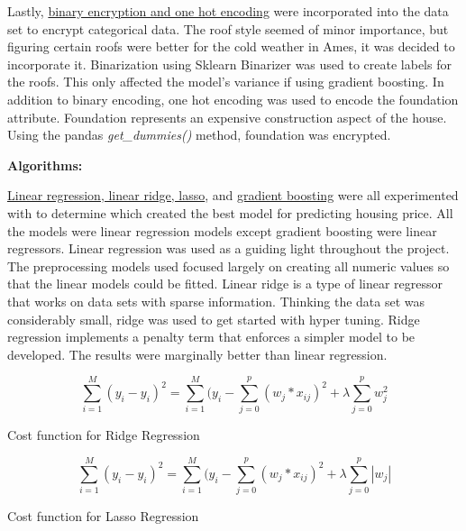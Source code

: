 \documentclass[letterpaper,10pt]{article}
\begin{document}
Lastly, \href{https://towardsdatascience.com/smarter-ways-to-encode-categorical-data-for-machine-learning-part-1-of-3-6dca2f71b159} {binary encryption and one hot encoding} were incorporated into the data set to encrypt categorical data. The roof style seemed of minor importance, but figuring certain roofs were better for the cold weather in Ames, it was decided to incorporate it. Binarization using Sklearn Binarizer was used to create labels for the roofs. This only affected the model’s variance if using gradient boosting. In addition to binary encoding, one hot encoding was used to encode the foundation attribute. Foundation represents an expensive construction aspect of the house. Using the pandas {\it get\_dummies()} method, foundation was encrypted. 

    \textbf{Algorithms:} \par
\href{https://www.analyticsvidhya.com/blog/2017/06/a-comprehensive-guide-for-linear-ridge-and-lasso-regression/} {Linear regression, linear ridge, lasso}, and \href{https://scikit-learn.org/stable/modules/generated/sklearn.ensemble.GradientBoostingClassifier.html}{gradient boosting} were all experimented with to determine which created the best model for predicting housing price. All the models were linear regression models except gradient boosting were linear regressors. Linear regression was used as a guiding light throughout the project. The preprocessing models used focused largely on creating all numeric values so that the linear models could be fitted. 
Linear ridge is a type of linear regressor that works on data sets with sparse information. Thinking the data set was considerably small, ridge was used to get started with hyper tuning. Ridge regression implements a penalty term that enforces a simpler model to be developed. The results were marginally better than linear regression.\par

$$\sum_{i=1}^{M} (y_i - y_i)^2 = \sum_{i=1}^{M}(y_i - \sum_{j=0}^{p} (w_j * x_{ij})^2 + \lambda \sum_{j=0}^{p} w^2_j $$
\begin{center} Cost function for Ridge Regression
\end{center}

$$\sum_{i=1}^{M} (y_i - y_i)^2 = \sum_{i=1}^{M}(y_i - \sum_{j=0}^{p} (w_j * x_{ij})^2 + \lambda \sum_{j=0}^{p} |w_j| $$
\begin{center} Cost function for Lasso Regression
\end{center}
\end{document}
